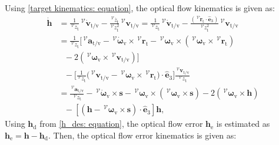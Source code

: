\documentclass[lettersize,journal]{IEEEtran}
\begin{document}
Using \eqref{target kinematics: equation}, the optical flow kinematics is given as:
\begin{align}
    \dot{\boldsymbol{h}} &= \frac{1}{\,^\mathcal{V} z_{\text{t}}}\,^\mathcal{V} \dot{\boldsymbol{v}}_{\text{t/v}} - \frac{\,^\mathcal{V} \dot{z_{\text{t}}}}{\,^\mathcal{V} z_{\text{t}}^2}\,^\mathcal{V} \boldsymbol{v}_{\text{t/v}} = \frac{1}{\,^\mathcal{V} z_{\text{t}}}\,^\mathcal{V} \dot{\boldsymbol{v}}_{\text{t/v}} - \frac{(\,^\mathcal{V} \dot{\boldsymbol{r}}_{\text{t}} \cdot \hat{\boldsymbol{e}}_3)}{\,^\mathcal{V} z_{\text{t}}^2}\,^\mathcal{V} \boldsymbol{v}_{\text{t/v}} \nonumber \\
    &= \frac{1}{\,^\mathcal{V} z_{\text{t}}} \Big[ \,^\mathcal{V} \boldsymbol{a}_{\text{t/v}} - \,^\mathcal{V} \dot{\boldsymbol{\omega}}_{\text{v}} \times \,^\mathcal{V} \boldsymbol{r}_{\text{t}} - \,^\mathcal{V} \boldsymbol{\omega}_{\text{v}} \times \left( \,^\mathcal{V} \boldsymbol{\omega}_{\text{v}} \times \,^\mathcal{V} \boldsymbol{r}_{\text{t}} \right) \nonumber \\
    &~~~ - 2 \left( \,^\mathcal{V} \boldsymbol{\omega}_{\text{v}} \times \,^\mathcal{V} \boldsymbol{v}_{\text{t/v}} \right) \Big] \nonumber \\
    &~~~ - \bigg[\frac{1}{\,^\mathcal{V} z_{\text{t}}} \big( \,^\mathcal{V} \boldsymbol{v}_{\text{t/v}} - \,^\mathcal{V} \boldsymbol{\omega}_{\text{v}} \times \,^\mathcal{V} \boldsymbol{r}_{\text{t}}\big) \cdot \hat{\boldsymbol{e}}_3 \bigg] \frac{\,^\mathcal{V} \boldsymbol{v}_{\text{t/v}}}{\,^\mathcal{V} z_{\text{t}}} \nonumber \\
    &= \frac{\,^\mathcal{V} \boldsymbol{a}_{\text{t/v}}}{\,^\mathcal{V} z_{\text{t}}} - \,^\mathcal{V} \dot{\boldsymbol{\omega}}_{\text{v}} \times \boldsymbol{s} - \,^\mathcal{V} \boldsymbol{\omega}_{\text{v}} \times \left( \,^\mathcal{V} \boldsymbol{\omega}_{\text{v}} \times \boldsymbol{s} \right) - 2 \left( \,^\mathcal{V} \boldsymbol{\omega}_{\text{v}} \times \boldsymbol{h} \right) \nonumber \\
    &~~~ - \left[\left( \boldsymbol{h} - \,^\mathcal{V} \boldsymbol{\omega}_{\text{v}} \times \boldsymbol{s} \right) \cdot \hat{\boldsymbol{e}}_3 \right] \boldsymbol{h},
\end{align}
Using $\boldsymbol{h}_\text{d}$ from \eqref{h_des: equation}, the optical flow error $\boldsymbol{h}_\text{e}$ is estimated as $\boldsymbol{h}_\text{e} = \boldsymbol{h} - \boldsymbol{h}_\text{d}$. Then, the optical flow error kinematics is given as:
\end{document}
